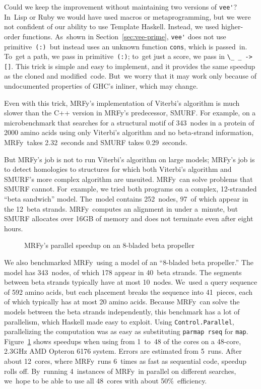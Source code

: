 \documentclass[]{jfp1}
\newcommand\mrfy{MRFy} %
\newcommand\primcons{\texttt{\small(:)}}
\newcommand\figref[1]{Figure~\ref{fig:#1}}
\newcommand\figlabel[1]{\label{fig:#1}}
\newcommand\secref[1]{Section~\ref{sec:#1}}
\begin{document}
Could we keep the improvement without 
maintaining two versions of \verb+vee'+?
In~Lisp or Ruby we would have used macros or metaprogramming,
but we were not confident of our ability to use Template Haskell.
Instead, we used higher-order functions.
As~shown in \secref{vee-prime},
\verb+vee'+ does not use primitive~\primcons\ but instead
uses an unknown function \texttt{cons}, which is
passed~in.
To~get a path, we pass in primitive~\primcons;
to~get just a score, we pass in
\verb+\_ _ -> []+.
This trick is simple and easy to implement, and it provides the same
speedup as the cloned and modified~code.
But~we worry that it may work only because of
undocumented properties of GHC's inliner, which may 
change.

Even with this trick,
MRFy's implementation of Viterbi's algorithm is much
slower than the C++ version in \mrfy's predecessor,
SMURF.
For example, on a microbenchmark that searches for a
structural motif of 343~nodes in a protein of 2000 amino acids
using only Viterbi's algorithm and no beta-strand information,
\mrfy\ takes 2.32~seconds and
SMURF takes 0.29~seconds.

But \mrfy's job is not to run Viterbi's algorithm on large models;
\mrfy's job is to detect homologies to structures for which both Viterbi's
algorithm and SMURF's more complex algorithm are unsuited.
\mrfy\ can solve problems that SMURF cannot.
For~example, we tried both programs on a complex, 12-stranded ``beta
sandwich'' 
model.
The~model contains 252~nodes,
97~of which appear in the 12~beta strands.
\mrfy\ computes an alignment in under a~minute,
but SMURF allocates
over 16GB of memory and does not terminate even after eight hours.


\begin{figure}%
\centerline{}
\medskip
\caption{\mrfy's parallel speedup on an 8-bladed beta propeller}
\figlabel{speedup}
\end{figure}

We also benchmarked \mrfy\ using a model of an ``8-bladed beta propeller.''
The model has 343~nodes, of which 178 appear in 40~beta strands.
The segments between beta strands typically have at most 10~nodes.
We~used a query sequence of 592 amino acids, but each placement breaks
the sequence into 41~pieces, each of which typically has at most 20 amino
acids.
Because \mrfy\ can solve the models between the beta strands independently,
this benchmark has a lot of parallelism,
which Haskell made easy to exploit.
Using
\texttt{Control.Parallel}, parallelizing the computation was as easy
as  substituting
\texttt{parmap rseq} for \texttt{map}.
\figref{speedup} shows speedups when using from 
 1~to~48 of the cores 
on a 48-core, 2.3GHz AMD Opteron 6176 system.
Errors are estimated from 5~runs.
After about 12~cores, where \mrfy\ runs 6~times as fast as sequential
code, speedup rolls off.
By~running 4~instances of \mrfy\ in parallel on different searches,
we~hope to be able to use all 48~cores with about 50\%~efficiency.
\end{document}
